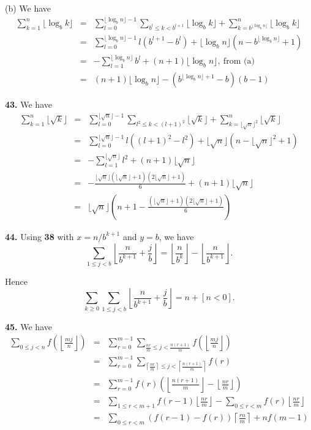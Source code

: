 \documentclass[a4paper,12pt]{article}
\newcommand{\newpar}[1]{\bigskip \noindent \textbf{#1.}}
\newcommand{\subpar}[1]{\medskip \noindent (#1)}
\begin{document}
\subpar{b}  We have
\begin{eqnarray*}
  \sum_{k=1}^n\lfloor \log_b k\rfloor &=& \sum_{l=0}^{\lfloor \log_b
    n\rfloor -1} \sum_{b^l \le k < b^{l+1}} \lfloor \log_b k\rfloor +
  \sum_{k = b^{\lfloor \log_b n\rfloor}}^n \lfloor \log_b k\rfloor \\
  &=& \sum_{l=0}^{\lfloor \log_b n\rfloor -1} l(b^{l+1}-b^l) +
  \lfloor \log_b n\rfloor (n - b^{\lfloor \log_b n\rfloor}+1) \\
  &=& - \sum_{l=1}^{\lfloor \log_b n\rfloor} b^l + (n+1) \lfloor
  \log_b n\rfloor,\ \mbox{from (a)}\\
  &=& (n+1)\lfloor \log_b n\rfloor - (b^{\lfloor \log_b n\rfloor +1}-b)(b-1)
\end{eqnarray*}

\newpar{43} We have
\begin{eqnarray*}
  \sum_{k=1}^n \lfloor \sqrt{k}\rfloor &=&
  \sum_{l=0}^{\lfloor \sqrt{n}\rfloor -1} \sum_{l^2 \le k < (l+1)^2}
  \lfloor \sqrt{k}\rfloor + \sum_{k=\lfloor \sqrt{n}\rfloor^2}^n
  \lfloor \sqrt{k}\rfloor \\
  &=& \sum_{l=0}^{\lfloor \sqrt{n}\rfloor -1} l((l+1)^2 - l^2) +
  \lfloor \sqrt{n}\rfloor(n - \lfloor \sqrt{n}\rfloor^2+1) \\
  &=& - \sum_{l=1}^{\lfloor\sqrt{n}\rfloor} l^2 + (n+1)\lfloor
  \sqrt{n}\rfloor \\
  &=& - \frac{\lfloor \sqrt{n}\rfloor (\lfloor \sqrt{n}\rfloor + 1)
    (2\lfloor\sqrt{n}\rfloor+1)}{6} + (n+1)\lfloor \sqrt{n}\rfloor \\
  &=& \lfloor\sqrt{n}\rfloor \left(n+1 - \frac{(\lfloor\sqrt{n}\rfloor
    + 1)(2\lfloor\sqrt{n}\rfloor+1)}{6}\right)
\end{eqnarray*}


\newpar{44}  Using \textbf{38} with $x = n/b^{k+1}$ and $y = b$, we have
\[ \sum_{1\le j<b} \left\lfloor \frac{n}{b^{k+1}} +
\frac{j}{b}\right\rfloor = \left\lfloor\frac{n}{b^k}\right\rfloor -
\left\lfloor\frac{n}{b^{k+1}}\right\rfloor.\]

Hence
\[ \sum_{k\ge 0} \sum_{1\le j<b} \left\lfloor \frac{n}{b^{k+1}} +
\frac{j}{b}\right\rfloor = n + [ n<0 ].\]

\newpar{45} We have
\begin{eqnarray*}
  \sum_{0\le j<n}f\left( \left\lfloor \frac{mj}{n} \right\rfloor
  \right) &=& \sum_{r=0}^{m-1} \sum_{\frac{nr}{m} \le j <
    \frac{n(r+1)}{m}} f\left( \left\lfloor \frac{mj}{n} \right\rfloor
  \right) \\
  &=& \sum_{r=0}^{m-1} \sum_{\left\lceil \frac{nr}{m}\right\rceil \le
    j < \left\lceil \frac{n(r+1)}{m}\right\rceil} f(r) \\
  &=& \sum_{r=0}^{m-1} f(r) \left( \left\lfloor \frac{n(r+1)}{m}
  \right\rfloor - \left\lfloor \frac{nr}{m} \right\rfloor \right) \\
  &=& \sum_{1\le r <m+1} f(r-1) \left\lfloor \frac{nr}{m}
  \right\rfloor - \sum_{0\le r < m} f(r)\left\lfloor \frac{nr}{m}
  \right\rfloor \\
  &=& \sum_{0\le r < m} (f(r-1) - f(r)) \left\lceil \frac{rn}{m}
  \right\rceil + n f(m-1)
\end{eqnarray*}
\end{document}
